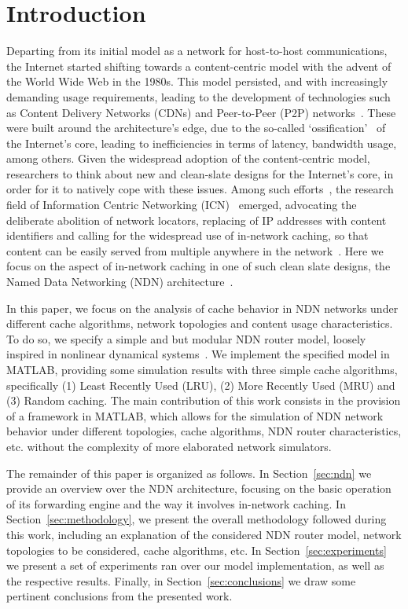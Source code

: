 \section{Introduction}
\label{sec:intro}

Departing from its initial model as a network for host-to-host communications, 
the Internet started shifting towards a content-centric model with the advent of 
the World Wide Web in the 1980s. This model persisted, 
and with increasingly demanding usage requirements, leading to the 
development of technologies such as 
Content Delivery Networks (CDNs) and Peer-to-Peer (P2P) 
networks~\cite{Passarella20121}. These were built around the architecture's 
edge, due to the so-called 
`ossification'~\cite{Handley:2006:WIO:1188052.1188101} of the Internet's core, 
leading to inefficiencies in terms of latency, bandwidth usage, among others. 
Given the widespread adoption of the content-centric model, 
researchers to think about new and clean-slate designs 
for the Internet's core, in order for it to natively cope with these issues. Among 
such efforts~\cite{5936152}, the research field of Information Centric Networking 
(ICN)~\cite{Xylomenos2013} emerged, 
advocating the deliberate abolition of network locators, replacing of IP 
addresses with content identifiers and calling for the widespread use of 
in-network caching, so that content can be easily served from multiple 
anywhere in the network~\cite{Koponen2007,Jacobson2009,Trossen2012,
Raychaudhuri2012,Han2012,Dannewitz:2013:NII:2459510.2459643}. Here we focus on the aspect of 
in-network caching in one of such clean slate designs, 
the Named Data Networking (NDN) architecture~\cite{Jacobson2009}.\shortvertbreak

In this paper, we focus on the analysis of cache behavior in NDN 
networks under different cache algorithms, network topologies and content 
usage characteristics. To do so, we specify a simple and but modular NDN router 
model, loosely inspired in nonlinear dynamical 
systems~\cite{Hedrick2010}. We implement the specified model in MATLAB\textsuperscript{\textregistered}, providing 
some simulation results with three simple cache algorithms, specifically (1) Least Recently 
Used (LRU), (2) More Recently Used (MRU) and (3) Random caching. The main contribution 
of this work consists in the provision of a framework in MATLAB\textsuperscript{\textregistered}, 
which allows for the simulation of NDN network behavior under different 
topologies, cache algorithms, NDN router characteristics, etc. without 
the complexity of more elaborated network simulators.\shortvertbreak

The remainder of this paper is organized as follows. In Section~\ref{sec:ndn} we provide an 
overview over the NDN architecture, focusing on the basic operation of its 
forwarding engine and the way it involves in-network caching. In 
Section~\ref{sec:methodology}, we present the overall methodology followed 
during this work, including an explanation of the considered NDN router model, 
network topologies to be considered, cache algorithms, etc. In Section~\ref{sec:experiments} we present a set of 
experiments ran over our model implementation, as well as the respective 
results. Finally, in Section~\ref{sec:conclusions} we draw some pertinent 
conclusions from the presented work.
